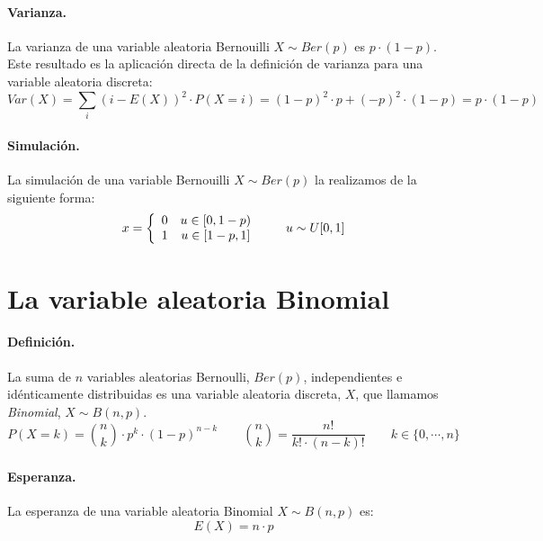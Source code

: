 \paragraph{Varianza.} La varianza de una variable aleatoria Bernouilli $X \sim Ber(p)$ 
es $p \cdot (1-p)$. Este resultado es la aplicaci\'on directa de la definici\'on 
de varianza para una variable aleatoria discreta:
\begin{displaymath}
Var(X)= \sum_{i} (i-E(X))^2 \cdot P(X=i) = (1-p)^2 \cdot p + (-p)^2 \cdot (1-p) = p \cdot (1-p)
\end{displaymath}
 
\paragraph{Simulaci\'on.} La simulaci\'on de una variable Bernouilli 
$X \sim Ber(p)$ la realizamos de la siguiente forma:
\begin{displaymath}
x= \left\{
\begin{array}{cc}
0 & u \in [0,1-p) \cr
1 & u \in [1-p,1]
\end{array}
\right.
\qquad u \sim U[0,1]
\end{displaymath}


\section{La variable aleatoria Binomial}

\paragraph{Definici\'on.} La suma de $n$ variables aleatorias Bernoulli, $Ber(p)$,  
independientes e id\'enticamente distribuidas es una variable aleatoria discreta, 
$X$, que llamamos \emph{Binomial}, $X \sim B(n,p)$.
\begin{displaymath}
P(X=k) = {n \choose k} \cdot p^k \cdot (1-p)^{n-k} \qquad {n \choose k} = \frac{n!}{k! \cdot (n-k)!}
\qquad k \in \{0, \cdots, n\}
\end{displaymath}

\paragraph{Esperanza.} La esperanza de una variable aleatoria Binomial 
$X \sim B(n,p)$ es:
\begin{displaymath}
E(X) = n \cdot p
\end{displaymath}

